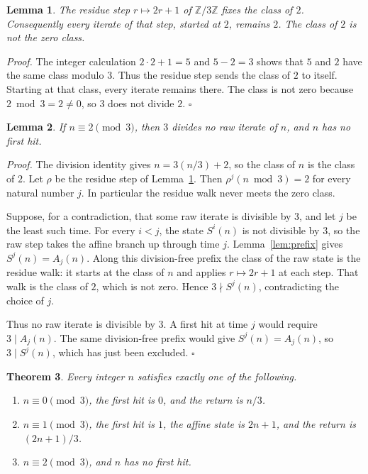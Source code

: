 \documentclass[11pt,letterpaper]{article}
\newcommand{\Z}{\mathbb{Z}}
\newtheorem{theorem}{Theorem}
\newtheorem{lemma}[theorem]{Lemma}
\newenvironment{proof}{\noindent\textit{Proof.}}{\hfill\(\square\)}
\begin{document}
\begin{lemma}
\label{lem:fix}
The residue step \(r\mapsto 2r+1\) of \(\Z/3\Z\) fixes the class of \(2\). Consequently every iterate of that step, started at \(2\), remains \(2\). The class of \(2\) is not the zero class.
\end{lemma}

\begin{proof}
The integer calculation \(2\cdot 2+1=5\) and \(5-2=3\) shows that \(5\) and \(2\) have the same class modulo \(3\). Thus the residue step sends the class of \(2\) to itself. Starting at that class, every iterate remains there. The class is not zero because \(2\bmod 3=2\neq 0\), so \(3\) does not divide \(2\).
\end{proof}

\begin{lemma}
\label{lem:two}
If \(n\equiv 2\pmod{3}\), then \(3\) divides no raw iterate of \(n\), and \(n\) has no first hit.
\end{lemma}

\begin{proof}
The division identity gives \(n=3(n/3)+2\), so the class of \(n\) is the class of \(2\). Let \(\rho\) be the residue step of Lemma~\ref{lem:fix}. Then \(\rho^{j}(n\bmod 3)=2\) for every natural number \(j\). In particular the residue walk never meets the zero class.

Suppose, for a contradiction, that some raw iterate is divisible by \(3\), and let \(j\) be the least such time. For every \(i<j\), the state \(S^{i}(n)\) is not divisible by \(3\), so the raw step takes the affine branch up through time \(j\). Lemma~\ref{lem:prefix} gives \(S^{j}(n)=A_{j}(n)\). Along this division-free prefix the class of the raw state is the residue walk: it starts at the class of \(n\) and applies \(r\mapsto 2r+1\) at each step. That walk is the class of \(2\), which is not zero. Hence \(3\nmid S^{j}(n)\), contradicting the choice of \(j\).

Thus no raw iterate is divisible by \(3\). A first hit at time \(j\) would require \(3\mid A_{j}(n)\). The same division-free prefix would give \(S^{j}(n)=A_{j}(n)\), so \(3\mid S^{j}(n)\), which has just been excluded.
\end{proof}

\begin{theorem}
\label{thm:tri}
Every integer \(n\) satisfies exactly one of the following.
\begin{enumerate}[label=\textup{(\roman*)}]
\item \(n\equiv 0\pmod{3}\), the first hit is \(0\), and the return is \(n/3\).
\item \(n\equiv 1\pmod{3}\), the first hit is \(1\), the affine state is \(2n+1\), and the return is \((2n+1)/3\).
\item \(n\equiv 2\pmod{3}\), and \(n\) has no first hit.
\end{enumerate}
\end{theorem}
\end{document}
